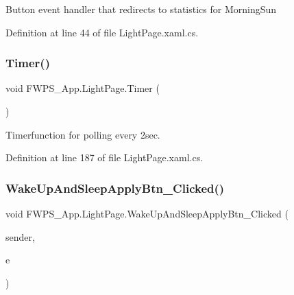 Button event handler that redirects to statistics for Morning\+Sun 

Definition at line 44 of file Light\+Page.\+xaml.\+cs.

\mbox{\label{class_f_w_p_s___app_1_1_light_page_a43b09976b1c9789c5e421145974e202c}} 
\subsubsection{\texorpdfstring{Timer()}{Timer()}}
{\footnotesize\ttfamily void F\+W\+P\+S\+\_\+\+App.\+Light\+Page.\+Timer (\begin{DoxyParamCaption}{ }\end{DoxyParamCaption})\hspace{0.3cm}{\ttfamily [private]}}



Timerfunction for polling every 2sec. 



Definition at line 187 of file Light\+Page.\+xaml.\+cs.

\mbox{\label{class_f_w_p_s___app_1_1_light_page_a05d841154f05b112f5cb7b5d32603f76}} 
\subsubsection{\texorpdfstring{Wake\+Up\+And\+Sleep\+Apply\+Btn\+\_\+\+Clicked()}{WakeUpAndSleepApplyBtn\_Clicked()}}
{\footnotesize\ttfamily void F\+W\+P\+S\+\_\+\+App.\+Light\+Page.\+Wake\+Up\+And\+Sleep\+Apply\+Btn\+\_\+\+Clicked (\begin{DoxyParamCaption}\item[{object}]{sender,  }\item[{Event\+Args}]{e }\end{DoxyParamCaption})\hspace{0.3cm}{\ttfamily [private]}}

